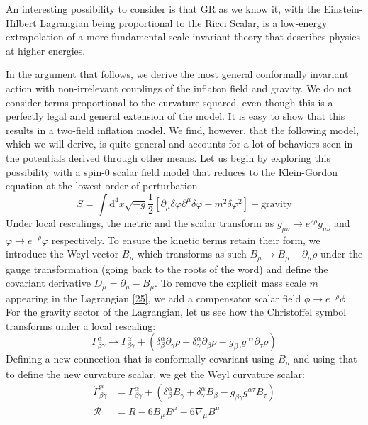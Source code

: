 \documentclass[aps,prd,reprint,preprintnumbers,showpacs,floatfix,nofootinbib,superscript address]{revtex4-2}
\begin{document}
An interesting possibility to consider is that GR as we know it, with the Einstein-Hilbert Lagrangian being proportional to the Ricci Scalar, is a low-energy extrapolation of a more fundamental scale-invariant theory that describes physics at higher energies. 

In the argument that follows, we derive the most general conformally invariant action with non-irrelevant couplings of the inflaton field and gravity. We do not consider terms proportional to the curvature squared, even though this is a perfectly legal and general extension of the model. It is easy to show that this results in a two-field inflation model. We find, however, that the following model, which we will derive, is quite general and accounts for a lot of behaviors seen in the potentials derived through other means. Let us begin by exploring this possibility with a spin-0 scalar field model that reduces to the Klein-Gordon equation at the lowest order of perturbation.
\begin{equation} \label{25}
    S = \int \mathrm{d}^4 x \sqrt{-g} \frac{1}{2} \left[ \partial_\mu \delta \varphi \partial^\mu \delta \varphi - m^2   \delta\varphi^2   \right] + \text{gravity}
\end{equation}
Under local rescalings, the metric and the scalar transform as $g_{\mu\nu} \rightarrow e^{2\rho} g_{\mu\nu} $ and  $\varphi \rightarrow e^{-\rho}\varphi$ respectively. To ensure the kinetic terms retain their form, we introduce the Weyl vector $B_\mu$ which transforms as such $B_{\mu} \rightarrow B_\mu - \partial_\mu \rho$ under the gauge transformation (going back to the roots of the word) and define the covariant derivative $D_\mu = \partial_\mu - B_\mu$. To remove the explicit mass scale $m$ appearing in the Lagrangian \ref{25}, we add a compensator scalar field $\phi \rightarrow e^{-\rho}\phi$. For the gravity sector of the Lagrangian, let us see how the Christoffel symbol transforms under a local rescaling:
\begin{equation}
    \Gamma^{\alpha}_{\beta \gamma} \rightarrow \Gamma^{\alpha}_{\beta \gamma} +(\delta^{\alpha}_{\beta} \partial_\gamma \rho + \delta^{\alpha}_{\gamma} \partial_{\beta} \rho - g_{\beta \gamma}g^{\alpha \tau}\partial_{\tau}\rho)
\end{equation}
Defining a new connection that is conformally covariant using $B_\mu$ and using that to define the new curvature scalar, we get the Weyl curvature scalar:
\begin{align}
    \mathring{\Gamma}^{\alpha}_{\beta \gamma} &= \Gamma^{\alpha}_{\beta \gamma} + (\delta^{\alpha}_{\beta} B_{\gamma} + \delta^{\alpha}_{\gamma} B_{\beta} - g_{\beta \gamma}g^{\alpha \tau}B_{\tau}) \nonumber \\
    \mathcal{R} &= R - 6 B_{\mu} B^{\mu} - 6 \nabla_\mu B^\mu
\end{align}
\end{document}
